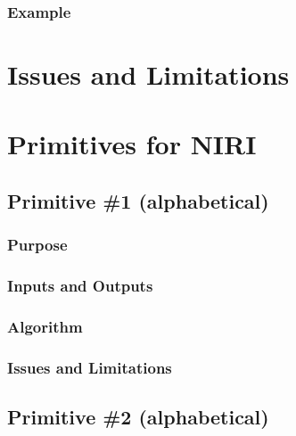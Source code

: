 \documentclass[letterpaper,10pt,english]{sphinxmanual}
\begin{document}
\subsubsection{Example}
\label{NIRI/tipstricks:id1}

\section{Issues and Limitations}
\label{NIRI/issueslimitations:niri-issues-limitations}\label{NIRI/issueslimitations::doc}\label{NIRI/issueslimitations:issues-and-limitations}

\section{Primitives for NIRI}
\label{NIRI/primitives:niri-primitives}\label{NIRI/primitives:primitives-for-niri}\label{NIRI/primitives::doc}

\subsection{Primitive \#1  (alphabetical)}
\label{NIRI/primitives_pages/primitive1:primitive-1-alphabetical}\label{NIRI/primitives_pages/primitive1:niri-primitive-1}\label{NIRI/primitives_pages/primitive1::doc}

\subsubsection{Purpose}
\label{NIRI/primitives_pages/primitive1:purpose}

\subsubsection{Inputs and Outputs}
\label{NIRI/primitives_pages/primitive1:inputs-and-outputs}

\subsubsection{Algorithm}
\label{NIRI/primitives_pages/primitive1:algorithm}

\subsubsection{Issues and Limitations}
\label{NIRI/primitives_pages/primitive1:issues-and-limitations}

\subsection{Primitive \#2  (alphabetical)}
\label{NIRI/primitives_pages/primitive2:niri-primitive-2}\label{NIRI/primitives_pages/primitive2::doc}\label{NIRI/primitives_pages/primitive2:primitive-2-alphabetical}
\end{document}
